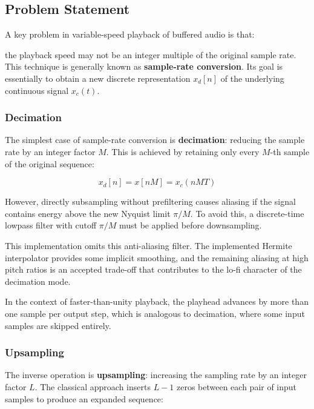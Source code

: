 \subsection{Problem Statement}

A key problem in variable-speed playback of buffered audio is that:

the playback speed may not be an integer multiple of the original sample rate. 
This technique is generally known as \textbf{sample-rate conversion}. 
Its goal is essentially to obtain a new discrete representation \(x_d[n]\) of the underlying continuous signal \(x_c(t)\).

\subsubsection{Decimation}

The simplest case of sample-rate conversion is \textbf{decimation}:
reducing the sample rate by an integer factor $M$.
This is achieved by retaining only every $M$-th sample of the original sequence:

\begin{equation}
x_d[n] = x[nM] = x_c(nMT)
\end{equation}

However, directly subsampling without prefiltering causes aliasing if the signal contains energy above the new Nyquist limit $\pi/M$. 
To avoid this, a discrete-time lowpass filter with cutoff $\pi/M$ must be applied before downsampling. \cite[p.~186]{oppenheimDiscretetimeSignalProcessing2014} 

This implementation omits this anti-aliasing filter. 
The implemented Hermite interpolator provides some implicit smoothing, and the remaining aliasing at high pitch ratios is an accepted trade-off that contributes to the lo-fi character of the decimation mode.

In the context of faster-than-unity playback, the playhead advances by more than one sample per output step, which is analogous to decimation, where some input samples are skipped entirely.

\subsubsection{Upsampling}
The inverse operation is \textbf{upsampling}: increasing the sampling rate by an integer factor $L$. 
The classical approach inserts $L-1$ zeros between each pair of input samples to produce an expanded sequence:

